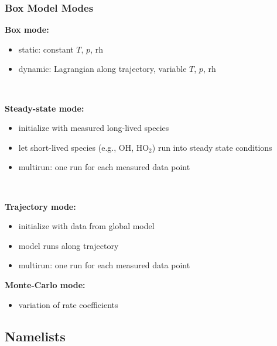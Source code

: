 \documentclass[t]{beamer}
\begin{document}
\begin{frame}

  \frametitle{Box Model Modes}
  \def\nosep{\setlength\parsep{0mm}\setlength\topsep{0mm}\setlength\itemsep{0mm}}

  \parbox[b]{0.6\textwidth}{{\bf Box mode:}\footnotesize
    \begin{itemize}\nosep
    \item static: constant $T$, $p$, rh
    \item dynamic: Lagrangian along trajectory, variable $T$, $p$, rh
    \end{itemize}}
  \\
  \parbox[b]{0.6\textwidth}{{\bf Steady-state mode:}\footnotesize
    \begin{itemize}\nosep
    \item initialize with measured long-lived species
    \item let short-lived species (e.g., OH, HO$_2$) run into steady
      state conditions
    \item multirun: one run for each measured data point
    \end{itemize}}
  \\
  \parbox[b]{0.6\textwidth}{{\bf Trajectory mode:}{\footnotesize
    \begin{itemize}\nosep
    \item initialize with data from global model
    \item model runs along trajectory
    \item multirun: one run for each measured data point
    \end{itemize}}
  {\bf Monte-Carlo mode:}\footnotesize
    \begin{itemize}\nosep
    \item variation of rate coefficients
    \end{itemize}}
  
\end{frame}


\subsection{Namelists}
\end{document}
